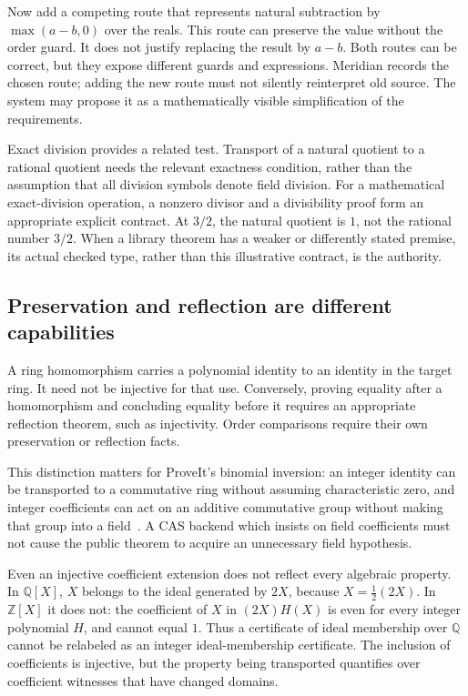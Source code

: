 \documentclass[11pt,a4paper]{article}
\newcommand{\Q}{\mathbb Q}
\newcommand{\Z}{\mathbb Z}
\theoremstyle{remark}
\begin{document}
Now add a competing route that represents natural subtraction by
$\max(a-b,0)$ over the reals. This route can preserve the value without the order
guard. It does not justify replacing the result by $a-b$. Both routes can be
correct, but they expose different guards and expressions. Meridian records the
chosen route; adding the new route must not silently reinterpret old source.
The system may propose it as a mathematically visible simplification of the
requirements.

Exact division provides a related test. Transport of a natural quotient to a
rational quotient needs the relevant exactness condition, rather than the
assumption that all division symbols denote field division. For a mathematical
exact-division operation, a nonzero divisor and a divisibility proof form an
appropriate explicit contract. At $3/2$, the natural quotient is $1$, not the
rational number $3/2$. When a library theorem has a weaker or differently stated
premise, its actual checked type, rather than this illustrative contract, is the
authority.

\subsection{Preservation and reflection are different capabilities}
A ring homomorphism carries a polynomial identity to an identity in the target
ring. It need not be injective for that use. Conversely, proving equality after
a homomorphism and concluding equality before it requires an appropriate
reflection theorem, such as injectivity. Order comparisons require their own
preservation or reflection facts.

This distinction matters for ProveIt's binomial inversion: an integer identity
can be transported to a commutative ring without assuming characteristic zero,
and integer coefficients can act on an additive commutative group without making
that group into a field~\cite{pbinomial}. A CAS backend which insists on field
coefficients must not cause the public theorem to acquire an unnecessary field
hypothesis.

Even an injective coefficient extension does not reflect every algebraic
property. In $\Q[X]$, $X$ belongs to the ideal generated by $2X$, because
$X=\frac12(2X)$. In $\Z[X]$ it does not: the coefficient of $X$ in $(2X)H(X)$ is
even for every integer polynomial $H$, and cannot equal $1$. Thus a certificate
of ideal membership over $\Q$ cannot be relabeled as an integer ideal-membership
certificate. The inclusion of coefficients is injective, but the property being
transported quantifies over coefficient witnesses that have changed domains.
\end{document}
